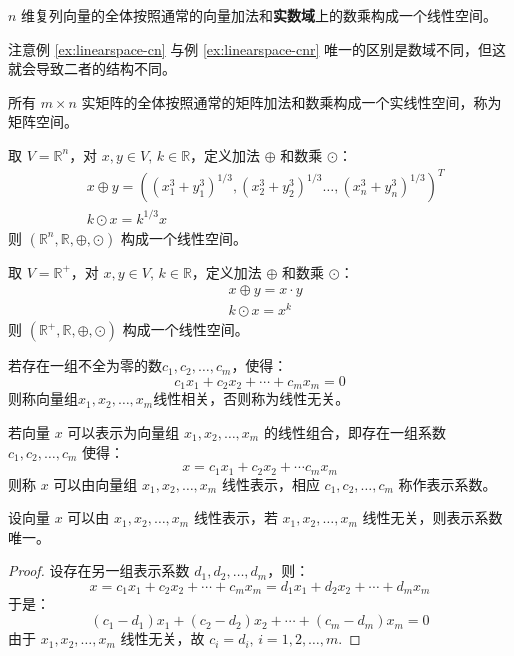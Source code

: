 \begin{example}
\label{ex:linearspace-cnr}
$n$ 维复列向量的全体按照通常的向量加法和\textbf{实数域}上的数乘构成一个线性空间。
\end{example}

\begin{note}
注意例 \ref{ex:linearspace-cn} 与例 \ref{ex:linearspace-cnr} 唯一的区别是数域不同，但这就会导致二者的结构不同。
\end{note}

\begin{example}
所有 $m\times n$ 实矩阵的全体按照通常的矩阵加法和数乘构成一个实线性空间，称为矩阵空间。
\end{example}

\begin{example}
\label{ex:linearspace}
取 $V=\mathbb R^n$，对 $x,y\in V,\,k\in\mathbb R$，定义加法 $\oplus$ 和数乘 $\odot$：
\begin{align*}
    &x\oplus y=\left((x_1^3+y_1^3)^{1/3},(x_2^3+y_2^3)^{1/3}\ldots,(x_n^3+y_n^3)^{1/3}\right)^T\\
    &k\odot x=k^{1/3}x
\end{align*}
则 $(\mathbb R^n,\mathbb R,\oplus,\odot)$ 构成一个线性空间。
\end{example}

\begin{example}
\label{ex:linearspace2}
取 $V=\mathbb R^+$，对 $x,y\in V,\,k\in\mathbb R$，定义加法 $\oplus$ 和数乘 $\odot$：
\begin{align*}
    &x\oplus y=x\cdot y\\
    &k\odot x=x^k
\end{align*}
则 $(\mathbb R^+,\mathbb R,\oplus,\odot)$ 构成一个线性空间。
\end{example}

\begin{definition}
若存在一组不全为零的数$c_1,c_2,\ldots,c_m$，使得：
\[
    c_1x_1+c_2x_2+\cdots+c_mx_m=0
\]
则称向量组$x_1,x_2,\ldots,x_m$线性相关，否则称为线性无关。
\end{definition}

\begin{definition}[线性表示]
若向量 $x$ 可以表示为向量组 $x_1,x_2,\ldots,x_m$ 的线性组合，即存在一组系数 $c_1,c_2,\ldots,c_m$ 使得：
\[
    x=c_1x_1+c_2x_2+\cdots c_mx_m
\]
则称 $x$ 可以由向量组 $x_1,x_2,\ldots,x_m$ 线性表示，相应 $c_1,c_2,\ldots,c_m$ 称作表示系数。
\end{definition}

\begin{theorem}
\label{thm:linear-repre-only}
设向量 $x$ 可以由 $x_1,x_2,\ldots,x_m$ 线性表示，若 $x_1,x_2,\ldots,x_m$ 线性无关，则表示系数唯一。
\end{theorem}
\begin{proof}
设存在另一组表示系数 $d_1,d_2,\ldots,d_m$，则：
\[
    x=c_1x_1+c_2x_2+\cdots+c_mx_m=d_1x_1+d_2x_2+\cdots+d_mx_m
\]
于是：
\[
    (c_1-d_1)x_1+(c_2-d_2)x_2+\cdots+(c_m-d_m)x_m=0
\]
由于 $x_1,x_2,\ldots,x_m$ 线性无关，故 $c_i=d_i,\,i=1,2,\ldots,m$.
\end{proof}

